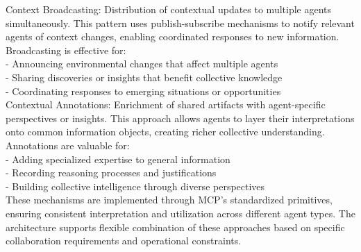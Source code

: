 Context Broadcasting: Distribution of contextual updates to multiple agents simultaneously. This pattern uses publish-subscribe mechanisms to notify relevant agents of context changes, enabling coordinated responses to new information. Broadcasting is effective for:\\ \newline
- Announcing environmental changes that affect multiple agents\\ \newline
- Sharing discoveries or insights that benefit collective knowledge\\ \newline
- Coordinating responses to emerging situations or opportunities\\ \newline
Contextual Annotations: Enrichment of shared artifacts with agent-specific perspectives or insights. This approach allows agents to layer their interpretations onto common information objects, creating richer collective understanding. Annotations are valuable for:\\ \newline
- Adding specialized expertise to general information\\ \newline
- Recording reasoning processes and justifications\\ \newline
- Building collective intelligence through diverse perspectives\\ \newline
These mechanisms are implemented through MCP's standardized primitives, ensuring consistent interpretation and utilization across different agent types. The architecture supports flexible combination of these approaches based on specific collaboration requirements and operational constraints.\\

